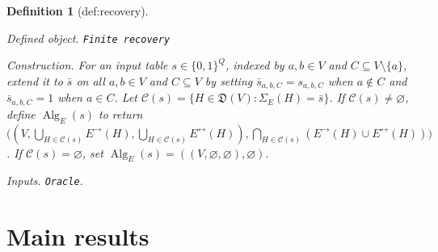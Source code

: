 \documentclass{article}
\newtheorem{definition}{Definition}
\begin{document}
\begin{definition}[def:recovery]\label{def:recovery}
\par\smallskip\noindent\emph{Defined object.} \texttt{Finite recovery}
\par\smallskip\noindent\emph{Construction.} For an input table \(s\in\{0,1\}^{Q}\), indexed by \(a,b\in V\) and \(C\subseteq V\setminus\{a\}\), extend it to \(\bar s\) on all \(a,b\in V\) and \(C\subseteq V\) by setting \(\bar s_{a,b,C}=s_{a,b,C}\) when \(a\notin C\) and \(\bar s_{a,b,C}=1\) when \(a\in C\). Let \(\mathcal C(s)=\{H\in\mathfrak D(V):\Sigma_E(H)=\bar s\}\). If \(\mathcal C(s)\ne\varnothing\), define \(\operatorname{Alg}_E(s)\) to return \(\bigl((V,\bigcup_{H\in\mathcal C(s)}E^{\to}(H),\bigcup_{H\in\mathcal C(s)}E^{\leftrightarrow}(H)),\bigcap_{H\in\mathcal C(s)}(E^{\to}(H)\cup E^{\leftrightarrow}(H))\bigr)\). If \(\mathcal C(s)=\varnothing\), set \(\operatorname{Alg}_E(s)=((V,\varnothing,\varnothing),\varnothing)\).
\par\smallskip\noindent\emph{Inputs.} \texttt{Oracle}.
\end{definition}

\section{Main results}
\end{document}

